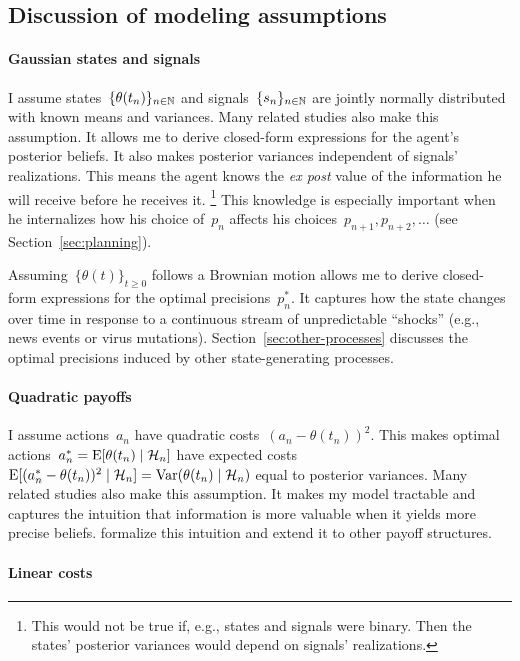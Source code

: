\documentclass[11pt,oneside]{article}
\begin{document}
\subsection{Discussion of modeling assumptions}

\paragraph{Gaussian states and signals}

I assume states~$\{\theta(t_n)\}_{n\in\mathbb{N}}$ and signals~$\{s_n\}_{n\in\mathbb{N}}$ are jointly normally distributed with known means and variances.
Many related studies also make this assumption.
It allows me to derive closed-form expressions for the agent's posterior beliefs.
It also makes posterior variances independent of signals' realizations.
This means the agent knows the \emph{ex post} value of the information he will receive before he receives it.%
\footnote{
This would not be true if, e.g., states and signals were binary.
Then the states' posterior variances would depend on signals' realizations.
}
This knowledge is especially important when he internalizes how his choice of~$p_n$ affects his choices~$p_{n+1},p_{n+2},\ldots$ (see Section~\ref{sec:planning}).

Assuming~$\{\theta(t)\}_{t\ge0}$ follows a Brownian motion allows me to derive closed-form expressions for the optimal precisions~$p_n^*$.
It captures how the state changes over time in response to a continuous stream of unpredictable ``shocks'' (e.g., news events or virus mutations).
Section~\ref{sec:other-processes} discusses the optimal precisions induced by other state-generating processes.

\paragraph{Quadratic payoffs}

I assume actions~$a_n$ have quadratic costs~$(a_n-\theta(t_n))^2$.
This makes optimal actions~$a_n^*=\operatorname{E}[\theta(t_n)\mid\mathcal{H}_n]$ have expected costs~$\operatorname{E}[(a_n^*-\theta(t_n))^2\mid\mathcal{H}_n]=\operatorname{Var}(\theta(t_n)\mid\mathcal{H}_n)$ equal to posterior variances.
Many related studies also make this assumption.
It makes my model tractable and captures the intuition that information is more valuable when it yields more precise beliefs.
\cite{Frankel-Kamenica-2019-AER} formalize this intuition and extend it to other payoff structures.

\paragraph{Linear costs}
\end{document}
